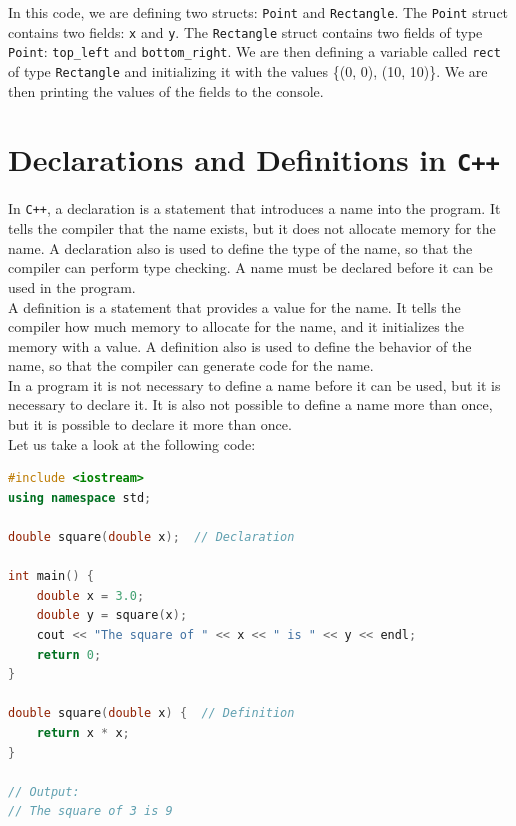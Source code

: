 In this code, we are defining two structs: \texttt{Point} and \texttt{Rectangle}. The \texttt{Point} struct contains two fields:
\texttt{x} and \texttt{y}. The \texttt{Rectangle} struct contains two fields of type \texttt{Point}: \texttt{top\_left} and
\texttt{bottom\_right}. We are then defining a variable called \texttt{rect} of type \texttt{Rectangle} and initializing it
with the values \{(0, 0), (10, 10)\}. We are then printing the values of the fields to the console.\\

\section{Declarations and Definitions in \texttt{C++}}

In \texttt{C++}, a declaration is a statement that introduces a name into the program. It tells the compiler that the name
exists, but it does not allocate memory for the name. A declaration also is used to define the type of the name, so that the
compiler can perform type checking. A name must be declared before it can be used in the program.\\

A definition is a statement that provides a value for the name. It tells the compiler how much memory to allocate for 
the name, and it initializes the memory with a value. A definition also is used to define the behavior of the name, so that
the compiler can generate code for the name.\\ 

In a program it is not necessary to define a name before it can be used, but it is necessary to declare it. It is also not
possible to define a name more than once, but it is possible to declare it more than once.\\

Let us take a look at the following code:

\begin{lstlisting}[language=C++]
#include <iostream>
using namespace std;

double square(double x);  // Declaration

int main() {
    double x = 3.0;
    double y = square(x);
    cout << "The square of " << x << " is " << y << endl;
    return 0;
}

double square(double x) {  // Definition
    return x * x;
}

// Output:
// The square of 3 is 9
\end{lstlisting}

